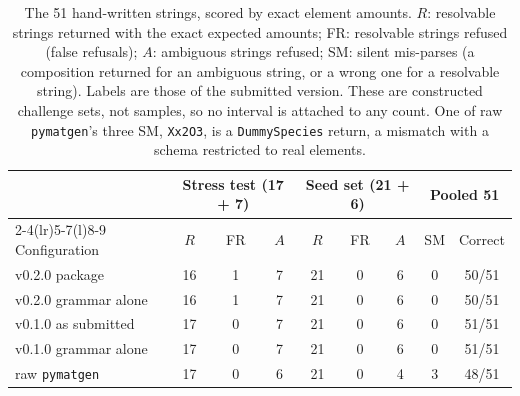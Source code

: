 \begin{table}[!t]
\centering
\caption{The 51 hand-written strings, scored by exact element amounts. $R$: resolvable strings returned with the exact expected amounts; FR: resolvable strings refused (false refusals); $A$: ambiguous strings refused; SM: silent mis-parses (a composition returned for an ambiguous string, or a wrong one for a resolvable string). Labels are those of the submitted version. These are constructed challenge sets, not samples, so no interval is attached to any count. One of raw \texttt{pymatgen}'s three SM, \texttt{Xx2O3}, is a \texttt{DummySpecies} return, a mismatch with a schema restricted to real elements.}
\label{tab:benchmarks}
\footnotesize
\setlength{\tabcolsep}{3pt}
\begin{tabular}{@{}lcccccccc@{}}
\toprule
 & \multicolumn{3}{c}{Stress test (17 + 7)} & \multicolumn{3}{c}{Seed set (21 + 6)} & \multicolumn{2}{c}{Pooled 51} \\
\cmidrule(lr){2-4}\cmidrule(lr){5-7}\cmidrule(l){8-9}
Configuration & $R$ & FR & $A$ & $R$ & FR & $A$ & SM & Correct \\
\midrule
v0.2.0 package & 16 & 1 & 7 & 21 & 0 & 6 & 0 & 50/51 \\
v0.2.0 grammar alone & 16 & 1 & 7 & 21 & 0 & 6 & 0 & 50/51 \\
v0.1.0 as submitted & 17 & 0 & 7 & 21 & 0 & 6 & 0 & 51/51 \\
v0.1.0 grammar alone & 17 & 0 & 7 & 21 & 0 & 6 & 0 & 51/51 \\
raw \texttt{pymatgen} & 17 & 0 & 6 & 21 & 0 & 4 & 3 & 48/51 \\
\bottomrule
\end{tabular}
\end{table}
